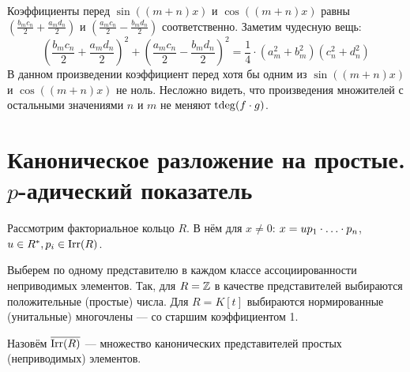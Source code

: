 \documentclass[a4paper]{report}
\begin{document}
{{{                Коэффициенты перед $\sin((m + n)x)$ и $\cos((m + n)x)$ равны $\left(\frac{b_m c_n}2 + \frac{a_m d_n}2\right)$ и $\left(\frac{a_m c_n}2 - \frac{b_m d_n}2\right)$ соответственно.
                Заметим чудесную вещь: \[\left(\frac{b_m c_n}2 + \frac{a_m d_n}2\right)^2 + \left(\frac{a_m c_n}2 - \frac{b_m d_n}2\right)^2 = \frac{1}{4}\cdot(a_m^2 + b_m^2)(c_n^2 + d_n^2)\]
                В данном произведении коэффициент перед хотя бы одним из $\sin((m + n)x)$ и $\cos((m + n)x)$ не ноль.
                Несложно видеть, что произведения множителей с остальными значениями $n$ и $m$ не меняют $\operatorname{tdeg}(f \cdot g)$.
            }
        }
        \corollary{$(\Trig_\R)^* = \R^*$}
    }



    \section{Каноническое разложение на простые. $p$-адический показатель}
    Рассмотрим факториальное кольцо $R$.
    В нём для $x \ne 0$: $x = u p_1 \cdot\ldots\cdot p_n$, $u \in R^*, p_i \in \operatorname{Irr}(R)$.

    Выберем по одному представителю в каждом классе ассоциированности неприводимых элементов.
    Так, для $R = \mathbb{Z}$ в качестве представителей выбираются положительные (простые) числа.
    Для $R = K[t]$ выбираются нормированные (унитальные) многочлены --- со старшим коэффициентом 1.

    Назовём $\overline{\operatorname{Irr}(R)}$ --- множество канонических представителей простых (неприводимых) элементов.

\end{document}
